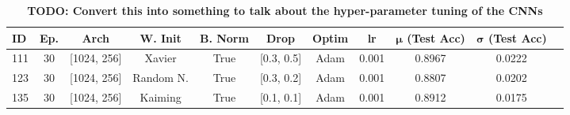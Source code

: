 \documentclass[11pt]{amsart}
\begin{document}
\begin{table}[h]
    \centering
    \begin{tabular}{|l|c|c|c|c|c|c|c|c|c|c|} %
        \hline
        \textbf{ID} & \textbf{Ep.}
        & \textbf{Arch} & \textbf{W. Init}
        & \textbf{B. Norm} & \textbf{Drop}
        & \textbf{Optim} & \textbf{lr}
	& \textbf{$\bm \mu$ (Test Acc)}
        & \textbf{$\bm \sigma$ (Test Acc)} \\ 
        \hline
        111 & 30 & [1024, 256]  & Xavier 	& True & [0.3, 0.5] & Adam & 0.001 & 0.8967 & 0.0222 \\
        \hline
        123 & 30 & [1024, 256]  & Random N. & True & [0.3, 0.2] & Adam & 0.001 & 0.8807 & 0.0202 \\
        \hline
        135 & 30 & [1024, 256]  & Kaiming 	& True & [0.1, 0.1] & Adam & 0.001 & 0.8912 & 0.0175 \\  
        \hline
    \end{tabular}
    \caption{\textbf{TODO: Convert this into something to talk about the hyper-parameter tuning of the CNNs}}
    \label{tab:tab0}
\end{table}

\end{document}
